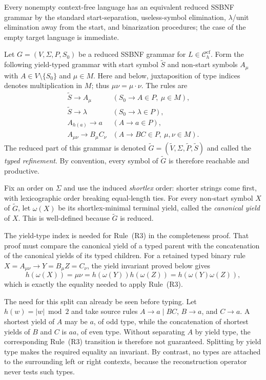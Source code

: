 \documentclass[11pt,a4paper]{article}
\theoremstyle{remark}
\theoremstyle{plain}
\newcommand{\cf}{\mathrm{cf}}
\newcommand{\Ccf}[1]{\mathcal C_{#1}^{\cf}}
\begin{document}
Every nonempty context-free language has an equivalent reduced SSBNF grammar by
the standard start-separation, useless-symbol elimination, $\lambda$/unit elimination
away from the start, and binarization procedures; the case of the empty
target language is immediate.

Let $G=(V,\Sigma,P,S_0)$ be a reduced SSBNF grammar for
$L\in\Ccf{h}$.  Form the following yield-typed grammar with start symbol
$\widetilde S$ and non-start symbols $A_\mu$ with
$A\in V\setminus\{S_0\}$ and $\mu\in M$.  Here and below, juxtaposition of type indices denotes multiplication in
$M$; thus $\mu\nu=\mu\cdot\nu$.  The rules are
\[
\begin{array}{ll}
\widetilde S\to A_\mu & (S_0\to A\in P,\ \mu\in M),\\
\widetilde S\to\lambda & (S_0\to\lambda\in P),\\
A_{h(a)}\to a & (A\to a\in P),\\
A_{\mu\nu}\to B_\mu C_\nu & (A\to BC\in P,\ \mu,\nu\in M).
\end{array}
\]
The reduced part of this grammar is denoted
$\widetilde G=(\widetilde V,\Sigma,\widetilde P,\widetilde S)$ and called
the \emph{typed refinement}.  By convention, every symbol of
$\widetilde G$ is therefore reachable and productive.

Fix an order on $\Sigma$ and use the induced \emph{shortlex} order:
shorter strings come first, with lexicographic order breaking equal-length
ties.  For every non-start symbol $X$ of $\widetilde G$, let $\omega(X)$
be its shortlex-minimal terminal yield, called the \emph{canonical yield} of
$X$.  This is well-defined because $\widetilde G$ is reduced.

The yield-type index is needed for Rule~(R3) in the completeness proof.
That proof must compare the canonical yield of a typed parent with the
concatenation of the canonical yields of its typed children.  For a retained
typed binary rule $X=A_{\mu\nu}\to Y=B_\mu Z=C_\nu$, the yield invariant
proved below gives
\[
 h(\omega(X))=\mu\nu
 =h(\omega(Y))h(\omega(Z))
 =h(\omega(Y)\omega(Z)),
\]
which is exactly the equality needed to apply Rule~(R3).

The need for this split can already be seen before typing.  Let
$h(w)=|w|\bmod 2$ and take source rules
$A\to a\mid BC$, $B\to a$, and $C\to a$.  A shortest yield of $A$
may be $a$, of odd type, while the concatenation of shortest yields of
$B$ and $C$ is $aa$, of even type.  Without separating $A$ by yield type,
the corresponding Rule~(R3) transition is therefore not guaranteed.
Splitting by yield type makes the required equality an invariant.  By
contrast, no types are attached to the surrounding left or right contexts,
because the reconstruction operator never tests such types.
\end{document}
